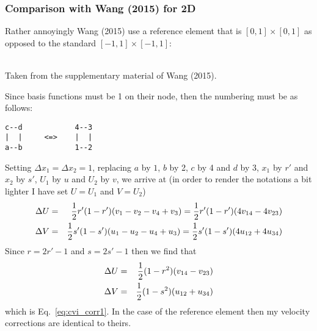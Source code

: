 \subsubsection{Comparison with Wang \etal (2015) for 2D}

Rather annoyingly Wang \etal (2015) use a reference element that is $[0,1]\times[0,1]$
as opposed to the standard $[-1,1]\times[-1,1]$:
\begin{center}
\\
{\captionfont Taken from the supplementary material of Wang \etal (2015).}
\end{center}
Since basis functions must be 1 on their node, then the numbering must be as follows:
\begin{verbatim}
c--d            4--3
|  |     <=>    |  |
a--b            1--2
\end{verbatim}
Setting $\Delta x_1=\Delta x_2=1$, replacing $a$ by $1$, $b$ by 2, 
$c$ by 4 and $d$ by 3, $x_1$ by $r'$ and $x_2$ by $s'$, $U_1$ by $u$
and $U_2$ by $v$, we arrive at 
(in order to render the notations a bit lighter I have set $U=U_1$ and $V=U_2$)
\begin{eqnarray}
\Delta U &=& \frac12 r'(1-r')(v_1-v_2-v_4+v_3) = \frac12 r'(1-r')(4v_{14}-4v_{23}) \nonumber\\
\Delta V &=& \frac12 s'(1-s')(u_1-u_2-u_4+u_3) = \frac12 s'(1-s')(4u_{12}+4u_{34}) \nonumber
\end{eqnarray}
Since $r=2r'-1$ and $s=2s'-1$ then we find that 
\begin{eqnarray}
\Delta U &=& \frac12 (1-r^2)(v_{14}-v_{23}) \nonumber\\
\Delta V &=& \frac12 (1-s^2)(u_{12}+u_{34})
\end{eqnarray}
which is Eq.~\eqref{eq:cvi_corr1}. In the case of the reference element then 
my velocity corrections are identical to theirs.

